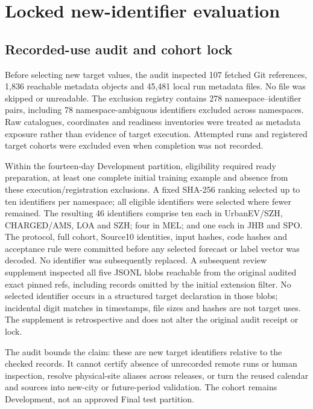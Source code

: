 \documentclass[pdflatex,iicol,sn-mathphys-num]{sn-jnl}
\begin{document}
\FloatBarrier
\section{Locked new-identifier evaluation}\label{sec:confirmation}
\subsection{Recorded-use audit and cohort lock}
Before selecting new target values, the audit inspected 107 fetched Git references, 1,836 reachable metadata objects and 45,481 local run metadata files. No file was skipped or unreadable. The exclusion registry contains 278 namespace--identifier pairs, including 78 namespace-ambiguous identifiers excluded across namespaces. Raw catalogues, coordinates and readiness inventories were treated as metadata exposure rather than evidence of target execution. Attempted runs and registered target cohorts were excluded even when completion was not recorded.

Within the fourteen-day Development partition, eligibility required ready preparation, at least one complete initial training example and absence from these execution/registration exclusions. A fixed SHA-256 ranking selected up to ten identifiers per namespace; all eligible identifiers were selected where fewer remained. The resulting 46 identifiers comprise ten each in UrbanEV/SZH, CHARGED/AMS, LOA and SZH; four in MEL; and one each in JHB and SPO. The protocol, full cohort, Source10 identities, input hashes, code hashes and acceptance rule were committed before any selected forecast or label vector was decoded. No identifier was subsequently replaced. A subsequent review supplement inspected all five JSONL blobs reachable from the original audited exact pinned refs, including records omitted by the initial extension filter. No selected identifier occurs in a structured target declaration in those blobs; incidental digit matches in timestamps, file sizes and hashes are not target uses. The supplement is retrospective and does not alter the original audit receipt or lock.

The audit bounds the claim: these are new target identifiers relative to the checked records. It cannot certify absence of unrecorded remote runs or human inspection, resolve physical-site aliases across releases, or turn the reused calendar and sources into new-city or future-period validation. The cohort remains Development, not an approved Final test partition.
\end{document}
